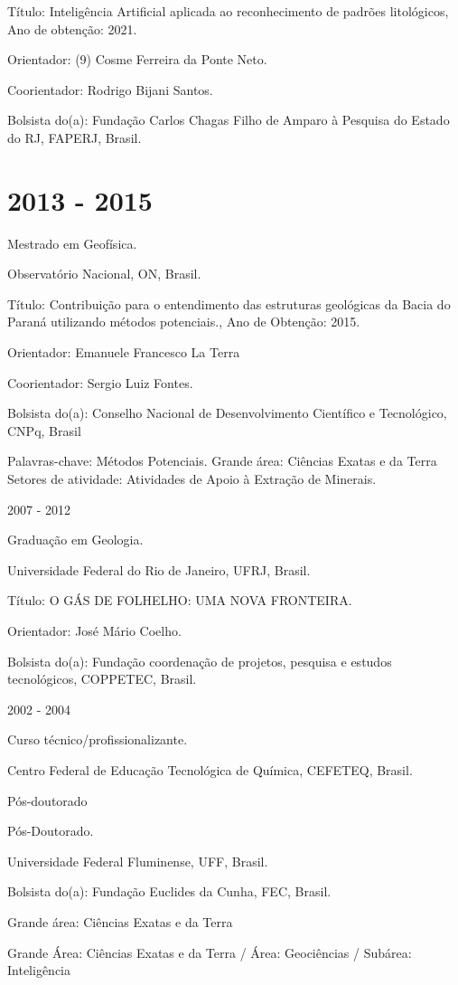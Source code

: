 \documentclass[10pt]{article}
\begin{document}
Título: Inteligência Artificial aplicada ao reconhecimento de padrões litológicos, Ano de obtenção: 2021.

Orientador: (9) Cosme Ferreira da Ponte Neto.

Coorientador: Rodrigo Bijani Santos.

Bolsista do(a): Fundação Carlos Chagas Filho de Amparo à Pesquisa do Estado do RJ, FAPERJ, Brasil.

\section*{2013 - 2015}
Mestrado em Geofísica.

Observatório Nacional, ON, Brasil.

Título: Contribuição para o entendimento das estruturas geológicas da Bacia do Paraná utilizando métodos potenciais., Ano de Obtenção: 2015.

Orientador: Emanuele Francesco La Terra

Coorientador: Sergio Luiz Fontes.

Bolsista do(a): Conselho Nacional de Desenvolvimento Científico e Tecnológico, CNPq, Brasil

Palavras-chave: Métodos Potenciais. Grande área: Ciências Exatas e da Terra Setores de atividade: Atividades de Apoio à Extração de Minerais.

2007 - 2012

Graduação em Geologia.

Universidade Federal do Rio de Janeiro, UFRJ, Brasil.

Título: O GÁS DE FOLHELHO: UMA NOVA FRONTEIRA.

Orientador: José Mário Coelho.

Bolsista do(a): Fundação coordenação de projetos, pesquisa e estudos tecnológicos, COPPETEC, Brasil.

2002 - 2004

Curso técnico/profissionalizante.

Centro Federal de Educação Tecnológica de Química, CEFETEQ, Brasil.

Pós-doutorado

Pós-Doutorado.

Universidade Federal Fluminense, UFF, Brasil.

Bolsista do(a): Fundação Euclides da Cunha, FEC, Brasil.

Grande área: Ciências Exatas e da Terra

Grande Área: Ciências Exatas e da Terra / Área: Geociências / Subárea: Inteligência
\end{document}
